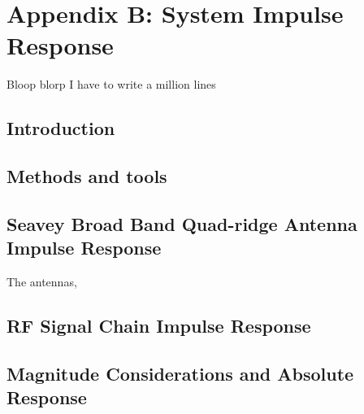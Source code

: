 %
%
%
%



\chapter{Appendix B: System Impulse Response}

Bloop blorp I have to write a million lines

\section{Introduction}

\section{Methods and tools}

\section{Seavey Broad Band Quad-ridge Antenna Impulse Response}

	The antennas, 

\section{RF Signal Chain Impulse Response}


\section{Magnitude Considerations and Absolute Response}
	

